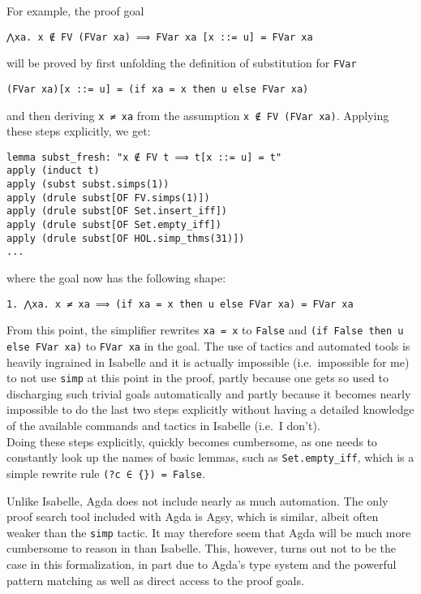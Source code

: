 \documentclass[a4paper, 12pt, twoside]{style/ociamthesis}
\theoremstyle{plain}
\theoremstyle{definition}
\newtheorem{Example}{Example}[chapter]
\theoremstyle{remark}
\renewenvironment{Example}{\begin{OldExample}\begin{mdframed}[style=example, linecolor=yellow]}{\end{mdframed}\end{OldExample}}
\begin{document}
\begin{Example}

For example, the proof goal

\begin{verbatim}
⋀xa. x ∉ FV (FVar xa) ⟹ FVar xa [x ::= u] = FVar xa
\end{verbatim}

will be proved by first unfolding the definition of substitution for
\texttt{FVar}

\begin{verbatim}
(FVar xa)[x ::= u] = (if xa = x then u else FVar xa)
\end{verbatim}

and then deriving \texttt{x ≠ xa} from the assumption
\texttt{x ∉ FV (FVar xa)}. Applying these steps explicitly, we get:

\begin{verbatim}
lemma subst_fresh: "x ∉ FV t ⟹ t[x ::= u] = t"
apply (induct t)
apply (subst subst.simps(1))
apply (drule subst[OF FV.simps(1)])
apply (drule subst[OF Set.insert_iff])
apply (drule subst[OF Set.empty_iff])
apply (drule subst[OF HOL.simp_thms(31)])
...
\end{verbatim}

where the goal now has the following shape:

\begin{verbatim}
1. ⋀xa. x ≠ xa ⟹ (if xa = x then u else FVar xa) = FVar xa
\end{verbatim}

From this point, the simplifier rewrites \texttt{xa = x} to
\texttt{False} and \texttt{(if False then u else FVar xa)} to
\texttt{FVar xa} in the goal. The use of tactics and automated tools is
heavily ingrained in Isabelle and it is actually impossible
(i.e.~impossible for me) to not use \texttt{simp} at this point in the
proof, partly because one gets so used to discharging such trivial goals
automatically and partly because it becomes nearly impossible to do the
last two steps explicitly without having a detailed knowledge of the
available commands and tactics in Isabelle (i.e.~I don't).\\
Doing these steps explicitly, quickly becomes cumbersome, as one needs
to constantly look up the names of basic lemmas, such as
\texttt{Set.empty\_iff}, which is a simple rewrite rule
\texttt{(?c ∈ \{\}) = False}.

\end{Example}

Unlike Isabelle, Agda does not include nearly as much automation. The
only proof search tool included with Agda is Agsy, which is similar,
albeit often weaker than the \texttt{simp} tactic. It may therefore seem
that Agda will be much more cumbersome to reason in than Isabelle. This,
however, turns out not to be the case in this formalization, in part due
to Agda's type system and the powerful pattern matching as well as
direct access to the proof goals.
\end{document}
